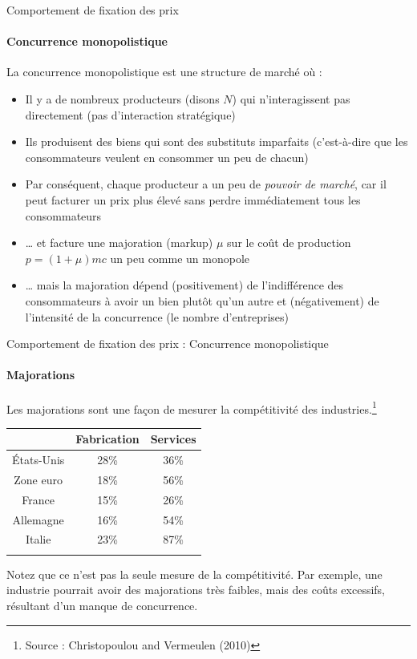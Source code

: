 \documentclass[
  ignorenonframetext,
  aspectratio=169,
]{beamer}
\providecommand{\tightlist}{%
  \setlength{\itemsep}{0pt}\setlength{\parskip}{0pt}}\usepackage{longtable,booktabs,array}
\begin{document}
\begin{frame}{Comportement de fixation des prix}
\label{comportement-de-fixation-des-prix-2}
\framesubtitle{Concurrence monopolistique}

La concurrence monopolistique est une structure de marché où :

\begin{itemize}
\tightlist
\item
  Il y a de nombreux producteurs (disons \(N\)) qui n'interagissent pas
  directement (pas d'interaction stratégique)
\item
  Ils produisent des biens qui sont des substituts imparfaits
  (c'est-à-dire que les consommateurs veulent en consommer un peu de
  chacun)
\item
  Par conséquent, chaque producteur a un peu de \emph{pouvoir de
  marché}, car il peut facturer un prix plus élevé sans perdre
  immédiatement tous les consommateurs
\item
  \ldots{} et facture une majoration (markup) \(\mu\) sur le coût de
  production \(p=(1+\mu)mc\) un peu comme un monopole
\item
  \ldots{} mais la majoration dépend (positivement) de l'indifférence
  des consommateurs à avoir un bien plutôt qu'un autre et (négativement)
  de l'intensité de la concurrence (le nombre d'entreprises)
\end{itemize}
\end{frame}

\begin{frame}{Comportement de fixation des prix : Concurrence
monopolistique}
\label{comportement-de-fixation-des-prix-concurrence-monopolistique}
\framesubtitle{Majorations}

Les majorations sont une façon de mesurer la compétitivité des
industries.\footnote{Source : Christopoulou and Vermeulen (2010)}

\begin{longtable}[]{@{}ccc@{}}
\toprule\noalign{}
& Fabrication & Services \\
\midrule\noalign{}
\endhead
États-Unis & 28\% & 36\% \\
Zone euro & 18\% & 56\% \\
France & 15\% & 26\% \\
Allemagne & 16\% & 54\% \\
Italie & 23\% & 87\% \\
\bottomrule\noalign{}
\end{longtable}

Notez que ce n'est pas la seule mesure de la compétitivité. Par exemple,
une industrie pourrait avoir des majorations très faibles, mais des
coûts excessifs, résultant d'un manque de concurrence.
\end{frame}
\end{document}
